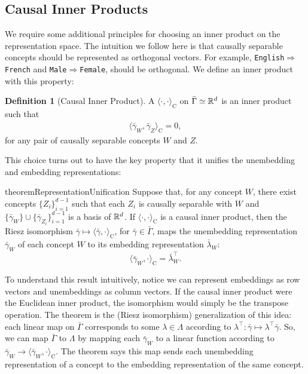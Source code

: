 \documentclass{article}
\theoremstyle{plain}
\theoremstyle{definition}
\newtheorem{definition}[theorem]{Definition}
\theoremstyle{remark}
\newcommand{\ConceptDirName}[2]{\texttt{#1$\Rightarrow$#2}}
\newcommand{\ip}[2]{\langle #1,#2\rangle}
\begin{document}
\subsection{Causal Inner Products}
We require some additional principles for choosing an inner product on the representation space.
The intuition we follow here is that causally separable concepts should be represented as orthogonal vectors.
For example, \ConceptDirName{English}{French} and \ConceptDirName{Male}{Female}, should be orthogonal.
We define an inner product with this property:
\begin{definition}
    [Causal Inner Product]\label{def:causal_inner_product}
    A  $\ip{\cdot}{\cdot}_{\mathrm{C}}$ on $\bar\Gamma \simeq \mathbb{R}^d$ is an inner product such that
    \begin{align*}
        \ip{\bar{\gamma}_W}{\bar{\gamma}_Z}_{\mathrm{C}} = 0,
    \end{align*}
    for any pair of causally separable concepts $W$ and $Z$.
\end{definition}

This choice turns out to have the key property that it unifies the unembedding and embedding representations:
\begin{restatable}{theorem}{RepresentationUnification}\label{thm:isomorphism}
    Suppose that, for any concept $W$, there exist concepts $\{Z_i\}_{i=1}^{d-1}$ such that each $Z_i$ is causally separable with $W$ and $\{\bar\gamma_W\}\cup\{\bar\gamma_{Z_i}\}_{i=1}^{d-1}$ is a basis of $\mathbb{R}^d$. If $\ip{\cdot}{\cdot}_{\mathrm{C}}$ is a causal inner product, then the Riesz isomorphism $\bar\gamma \mapsto \ip{\bar\gamma}{\cdot}_{\mathrm{C}}$, for $\bar\gamma \in \bar\Gamma$, maps the unembedding representation $\bar\gamma_W$ of each concept $W$ to its embedding representation $\bar\lambda_W$:
    \begin{equation*}
        \ip{\bar{\gamma}_W}{\cdot}_{\mathrm{C}} = \bar\lambda_W^\top .
    \end{equation*}
\end{restatable}
To understand this result intuitively, notice we can represent embeddings as row vectors and unembeddings as column vectors. If the causal inner product were the Euclidean inner product, the isomorphism would simply be the transpose operation. The theorem is the (Riesz isomorphism) generalization of this idea: each linear map on $\bar{\Gamma}$ corresponds to some $\lambda \in \Lambda$ according to $\lambda^\top: \bar{\gamma} \mapsto \lambda^\top \bar{\gamma}$.
So, we can map $\bar{\Gamma}$ to $\Lambda$ by mapping each $\bar{\gamma}_W$ to a linear function according to $\bar{\gamma}_W \to \ip{\bar{\gamma}_W}{\cdot}_{\mathrm{C}}$. The theorem says this map sends each unembedding representation of a concept to the embedding representation of the same concept.
\end{document}
